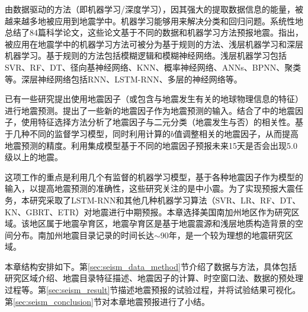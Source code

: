 由数据驱动的方法（即机器学习/深度学习），因其强大的提取数据信息的能量，被越来越多地被应用到地震学中\citep{Alves2006Earthquake,Madahizadeh2009prediction,Panakkat2007Neural,Sunkara2009Model}。机器学习能够用来解决分类和回归问题。\citet{al2020application}系统性地总结了84篇科学论文，这些论文基于不同的数据和机器学习方法预报地震。\citet{al2020application}指出，被应用在地震学中的机器学习方法可被分为基于规则的方法、浅层机器学习和深层机器学习。基于规则的方法包括模糊逻辑\citep{zhong2010prediction,zamani2013application,mirrashid2014earthquake}和模糊神经网络\citep{Lopez2019Evolutionary}。浅层机器学习包括SVR\citep{asencio2017temporal}、RF\citep{asim2017earthquake}、DT\citep{asencio2017temporal}、径向基神经网络\citep{Alexandridis2014Large}、KNN\citep{Panakkat2007Neural,asencio2017temporal}、概率神经网络\citep{Adeli2009A}、ANNs\citep{morales2013earthquake,asencio2017temporal}、BPNN\citep{Panakkat2007Neural,Narayanakumar2016A}、聚类\citep{shodiq2018neural}等。深层神经网络包括RNN\citep{Panakkat2009Recurrent,asim2017earthquake}、LSTM-RNN\citep{Wang2017Earthquake,Bhatia2018EARTHQUAKE,berhich2020lstm}、多层的神经网络\citep{huang2018large}等。

已有一些研究提出使用地震因子（或包含与地震发生有关的地球物理信息的特征）进行地震预测\citep{Panakkat2007Neural,martinez2013determining,reyes2013neural,morales2013earthquake,asencio2016sensitivity}。\citet{reyes2013neural}提出了一些新的地震因子作为地震预测的输入。\citet{martinez2013determining}结合了\citet{Panakkat2007Neural}中的地震因子，使用特征选择方法分析了地震因子与二元分类（地震发生与否）的相关性。\citet{asencio2016sensitivity}基于几种不同的监督学习模型，同时利用计算的$b$值调整相关的地震因子，从而提高地震预测的精度。\citet{asim2018seismic}利用集成模型基于不同的地震因子预报未来15天是否会出现5.0级以上的地震。

这项工作的重点是利用几个有监督的机器学习模型，基于各种地震因子作为模型的输入，以提高地震预测的准确性，这些研究关注的是中小震。为了实现预报大震任务，本研究采取了LSTM-RNN\citep{Wang2017Earthquake,Bhatia2018EARTHQUAKE,berhich2020lstm}和其他几种机器学习算法（SVR、LR、RF、DT、KN、GBRT、ETR）对地震进行中期预报。本章选择美国南加州地区作为研究区域。该地区属于地震孕育区，地震孕育区是基于地震震源和浅层地质构造背景的空间分布。南加州地震目录记录的时间长达$\sim$90年，是一个较为理想的地震研究区域。

本章结构安排如下。第\ref{sec:seism_data_method}节介绍了数据与方法，具体包括研究区域介绍、地震目录特征描述、地震因子的计算、时空窗口法、数据的预处理过程等。第\ref{sec:seism_result}节描述地震预报的试验过程，并将试验结果可视化。第\ref{sec:seism_conclusion}节对本章地震预报进行了小结。

